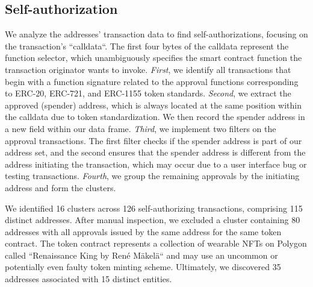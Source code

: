 \documentclass[12pt,a4paper,titlepage,oneside,english]{article}
\begin{document}
\subsection{Self-authorization}
We analyze the addresses' transaction data to find self-authorizations, focusing on the transaction's ``calldata``. The first four bytes of the calldata represent the function selector, which unambiguously specifies the smart contract function the transaction originator wants to invoke. \newline
\textit{First}, we identify all transactions that begin with a function signature related to the approval functions corresponding to ERC-20, ERC-721, and ERC-1155 token standards. \textit{Second}, we extract the approved (spender) address, which is always located at the same position within the calldata due to token standardization. We then record the spender address in a new field within our data frame. \textit{Third}, we implement two filters on the approval transactions. The first filter checks if the spender address is part of our address set, and the second ensures that the spender address is different from the address initiating the transaction, which may occur due to a user interface bug or testing transactions. \textit{Fourth}, we group the remaining approvals by the initiating address and form the clusters.

We identified 16 clusters across 126 self-authorizing transactions, comprising 115 distinct addresses. After manual inspection, we excluded a cluster containing 80 addresses with all approvals issued by the same address for the same token contract. The token contract represents a collection of wearable NFTs on Polygon called ``Renaissance King by René Mäkelä`` and may use an uncommon or potentially even faulty token minting scheme. Ultimately, we discovered 35 addresses associated with 15 distinct entities.
\end{document}

